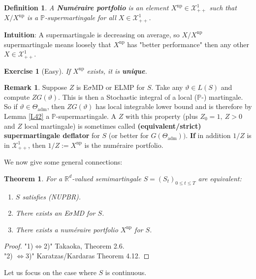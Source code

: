 \documentclass[12pt,a4paper, twoside]{article}
\newtheorem{thm}{Theorem}[section]
\newtheorem{defn}{Definition}[section]
\newtheorem{exe}{Exercise}[section]
\theoremstyle{definition}
\newtheorem{rem}{Remark}[section]
\newcommand{\PP}{\mathbb{P}} %
\begin{document}
\newpage
\begin{defn} A \textbf{Numéraire portfolio} is an element $X^\text{np} \in \mathcal{X}_{++}^1$ such that $X/X^\text{np}$ is a $\PP$-supermartingale for all $X \in \mathcal{X}_{++}^1$. 
\end{defn}
\noindent \textbf{Intuition}: A supermartingale is decreasing on average, so $X/X^\text{np}$ supermartingale means loosely that $X^\text{np}$ has "better performance" then any other $X \in \mathcal{X}_{++}^1$.
\begin{exe}[Easy] If $X^\text{np}$ exists, it is \textbf{unique}.
\end{exe}
\begin{rem} Suppose $Z$ is E$\sigma$MD or ELMP for $S$. Take any $\vartheta \in L(S)$ and compute $ZG( \vartheta)$. This is then a Stochastic integral of a local ($\PP$-) martingale. So if $\vartheta \in \Theta_\text{adm}$, then $ZG( \vartheta)$ has local integrable lower bound and is therefore by Lemma \ref{L42} a $\PP$-supermartingale. A $Z$ with this property (plus $Z_0=1, \ Z >0$ and $Z$ local martingale) is sometimes called \textbf{(equivalent/strict)} \textbf{supermartingale deflator} for $S$ (or better for $G( \Theta_\text{adm}))$. \textbf{If} in addition $1/Z$ is in $\mathcal{X}_{++}^1$, then $1/Z:= X^\text{np}$ is the numéraire portfolio. 
\end{rem}
We now give some general connections:
\begin{thm} \label{T51} For a $\mathbb{R}^d$-valued semimartingale $S=(S_t)_{0 \leq t \leq T}$ are equivalent: 
\begin{enumerate}
\item $S$ satisfies (NUPBR).
\item There exists an E$\sigma$MD for $S$.
\item There exists a numéraire portfolio $X^\text{np}$ for $S$. 
\end{enumerate}
\end{thm}
\begin{proof}
"1)$\iff$2)" Takaoka, Theorem 2.6. \\
"2) $\iff$3)" Karatzas/Kardaras Theorem 4.12.
\end{proof}
Let us focus on the case where $S$ is continuous.
\end{document}
